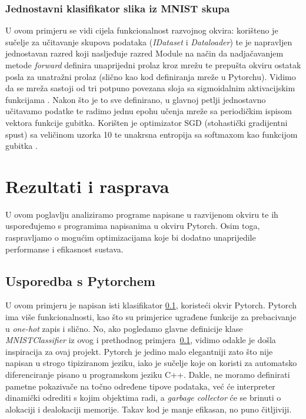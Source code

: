 \documentclass[zavrsnirad]{fer}
\begin{document}


\subsection{Jednostavni klasifikator slika iz MNIST skupa}
\label{pog:klasifikator}

U ovom primjeru se vidi cijela funkcionalnost razvojnog okvira: korišteno je sučelje za učitavanje skupova podataka (\textit{IDataset} i \textit{Dataloader}) te je napravljen jednostavan razred koji nasljeđuje razred Module na način da nadjačavanjem metode \textit{forward} definira unaprijedni prolaz kroz mrežu te prepušta okviru ostatak posla za unatražni prolaz (slično kao kod definiranja mreže u Pytorchu). Vidimo da se mreža sastoji od tri potpuno povezana sloja sa sigmoidalnim aktivacijskim funkcijama \cite{implement:sigmoid}. Nakon što je to sve definirano, u glavnoj petlji jednostavno učitavamo podatke te radimo jednu epohu učenja mreže sa periodičkim ispisom vektora funkcije gubitka. Korišten je optimizator SGD (stohastički gradijentni spust) sa veličinom uzorka 10 te unakrsna entropija sa softmaxom kao funkcijom gubitka \cite{implement:SGD}.

\chapter{Rezultati i rasprava}
\label{pog:rezultati_i_rasprava}

U ovom poglavlju analiziramo programe napisane u razvijenom okviru te ih uspoređujemo s programima napisanima u okviru Pytorch. Osim toga, raspravljamo o mogućim optimizacijama koje bi dodatno unaprijedile performanse i efikasnost sustava.

\section{Usporedba s Pytorchem}
U ovom primjeru je napisan isti klasifikator \ref{pog:klasifikator}, koristeći okvir Pytorch. Pytorch ima više funkcionalnosti, kao što su primjerice ugrađene funkcije za prebacivanje u \textit{one-hot} zapis i slično. No, ako pogledamo glavne definicije klase \textit{MNISTClassifier} iz ovog i prethodnog primjera~\ref{pog:klasifikator}, vidimo odakle je došla inspiracija za ovaj projekt. Pytorch je jedino malo elegantniji zato što nije napisan u strogo tipiziranom jeziku, iako je sučelje koje on koristi za automatsko diferenciranje pisano u programskom jeziku C++. Dakle, ne moramo definirati pametne pokazivače na točno određene tipove podataka, već će interpreter dinamički odrediti s kojim objektima radi, a \textit{garbage collector} će se brinuti o alokaciji i dealokaciji memorije. Takav kod je manje efikasan, no puno čitljiviji.

\end{document}
